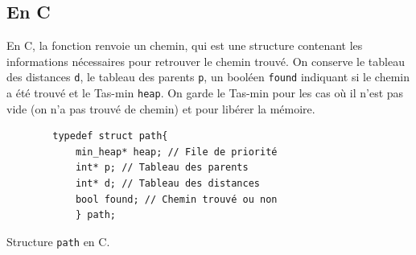 \subsection{En C}

En C, la fonction renvoie un chemin, qui est une structure contenant les informations nécessaires pour retrouver le chemin trouvé.
\newline\newline
On conserve le tableau des distances \texttt{d}, le tableau des parents \texttt{p}, un booléen \texttt{found} indiquant si le chemin a été trouvé et le Tas-min \texttt{heap}.
On garde le Tas-min pour les cas où il n'est pas vide (on n'a pas trouvé de chemin) et pour libérer la mémoire.

\begin{listing}[!htpb]
    \begin{verbatim}
        typedef struct path{
            min_heap* heap; // File de priorité
            int* p; // Tableau des parents
            int* d; // Tableau des distances
            bool found; // Chemin trouvé ou non
            } path;
    \end{verbatim}
    \caption{Structure \texttt{path} en C.}
    \label{listing:c-path}
\end{listing}